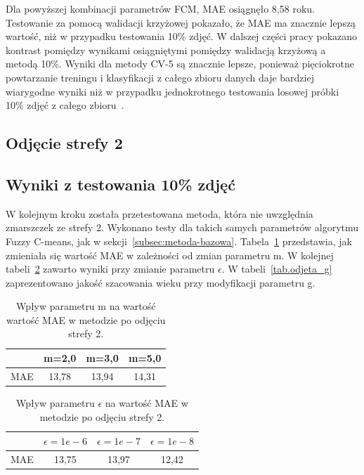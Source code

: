 \documentclass[a4paper,twoside,12pt]{book}
\begin{document}
    Dla powyższej kombinacji parametrów FCM, MAE osiągnęło 8,58 roku.
    Testowanie za pomocą walidacji krzyżowej pokazało, że MAE ma znacznie lepszą wartość, niż w przypadku testowania
    10\% zdjęć. W dalszej części pracy pokazano kontrast pomiędzy wynikami osiągniętymi pomiędzy walidacją krzyżową a
    metodą 10\%. Wyniki dla metody CV-5 są znacznie lepsze, ponieważ pięciokrotne powtarzanie treningu i klasyfikacji
    z całego zbioru danych daje bardziej wiarygodne wyniki niż w przypadku jednokrotnego testowania losowej
    próbki 10\% zdjęć z całego zbioru~\cite{dataMiningAlgorithms}.

    \subsection{Odjęcie strefy 2}\label{subsec:odjęcie-strefy-2}
    \subsection*{Wyniki z testowania 10\% zdjęć}
    W kolejnym kroku została przetestowana metoda, która nie uwzględnia zmarszczek ze strefy 2.
    Wykonano testy dla takich samych parametrów algorytmu Fuzzy C-means, jak w sekcji~\ref{subsec:metoda-bazowa}.
    Tabela~\ref{tab.odjeta_m} przedstawia, jak zmieniała się wartość MAE w zależności od zmian parametru m.
    W kolejnej tabeli~\ref{tab.odjeta_e} zawarto wyniki przy
    zmianie parametru $\epsilon$.
    W tabeli~\ref{tab.odjeta_g} zaprezentowano
    jakość szacowania
    wieku przy modyfikacji parametru g.
    \begin{table}[]
        \centering
        \caption{Wpływ parametru m na wartość wartość MAE w metodzie po odjęciu strefy 2.}
        \begin{tabular}{|c|c|c|c|}
            \hline
            & m=2,0 & m=3,0 & m=5,0 \\ \hline
            MAE & 13,78 & 13,94 & 14,31 \\ \hline
        \end{tabular}
        \label{tab.odjeta_m}
    \end{table}
    \begin{table}[]
        \centering
        \caption{Wpływ parametru $\epsilon$ na wartość MAE w metodzie po odjęciu strefy 2.}
        \begin{tabular}{|c|c|c|c|}
            \hline
            & $\epsilon=1e-6$ & $\epsilon=1e-7$ & $\epsilon=1e-8$ \\ \hline
            MAE & 13,75 & 13,97 & 12,42 \\ \hline
        \end{tabular}
        \label{tab.odjeta_e}
    \end{table}
\end{document}
